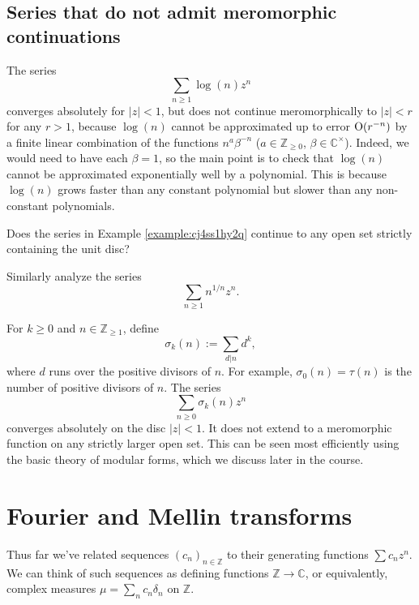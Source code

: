 \documentclass[reqno]{amsart}  \numberwithin{theorem}{section} \numberwithin{equation}{section}
\begin{document}
\subsection{Series that do not admit meromorphic continuations}\label{sec:cj4unj06mw}
\begin{example}\label{example:cj4ss1hy2q}
  The series
  \begin{equation*}
    \sum_{n \geq 1} \log(n) z^n
  \end{equation*}
  converges absolutely for $\lvert z \rvert < 1$, but does not continue meromorphically to $|z| < r$ for any $r > 1$, because $\log(n)$ cannot be approximated up to error $\operatorname{O}(r^{-n})$ by a finite linear combination of the functions $n^a \beta^{-n}$ ($a \in \mathbb{Z}_{\geq 0}$, $\beta \in \mathbb{C}^\times$).  Indeed, we would need to have each $\beta = 1$, so the main point is to check that $\log(n)$ cannot be approximated exponentially well by a polynomial.  This is because $\log(n)$ grows faster than any constant polynomial but slower than any non-constant polynomials.
\end{example}
\begin{question}
  Does the series in Example \ref{example:cj4ss1hy2q} continue to any open set strictly containing the unit disc?
\end{question}
\begin{exercise}
  Similarly analyze the series
  \begin{equation*}
    \sum_{n \geq 1} n^{1 / n} z^n.
  \end{equation*}
\end{exercise}
\begin{example}
  For $k \geq 0$ and $n \in \mathbb{Z}_{\geq 1}$, define
  \begin{equation*}
    \sigma_k(n) := \sum_{d | n} d^k,
  \end{equation*}
  where $d$ runs over the positive divisors of $n$.  For example, $\sigma_0(n) = \tau(n)$ is the number of positive divisors of $n$.  The series
  \begin{equation*}
    \sum_{n \geq 0} \sigma_k (n) z^n
  \end{equation*}
  converges absolutely on the disc $\lvert z \rvert < 1$.  It does not extend to a meromorphic function on any strictly larger open set.  This can be seen most efficiently using the basic theory of modular forms, which we discuss later in the course.
\end{example}

\newpage
\section{Fourier and Mellin transforms}\label{sec:cj4unjziaz}
Thus far we've related sequences $(c_n)_{n \in \mathbb{Z}}$ to their generating functions $\sum c_n z^n$.  We can think of such sequences as defining functions $\mathbb{Z} \rightarrow \mathbb{C}$, or equivalently, complex measures $\mu = \sum_n c_n \delta_n$ on $\mathbb{Z}$.
\end{document}
